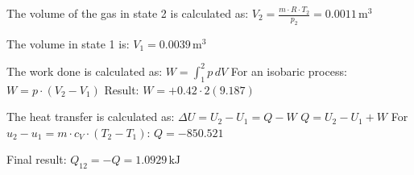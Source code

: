 The volume of the gas in state 2 is calculated as:  
\( V_2 = \frac{m \cdot R \cdot T_2}{p_2} = 0.0011 \, \text{m}^3 \)  

The volume in state 1 is:  
\( V_1 = 0.0039 \, \text{m}^3 \)  

The work done is calculated as:  
\( W = \int_{1}^{2} p \, dV \)  
For an isobaric process:  
\( W = p \cdot (V_2 - V_1) \)  
Result: \( W = +0.42 \cdot 2 (9.187) \)  

The heat transfer is calculated as:  
\( \Delta U = U_2 - U_1 = Q - W \)  
\( Q = U_2 - U_1 + W \)  
For \( u_2 - u_1 = m \cdot c_V \cdot (T_2 - T_1) \):  
\( Q = -850.521 \)  

Final result:  
\( Q_{12} = -Q = 1.0929 \, \text{kJ} \)